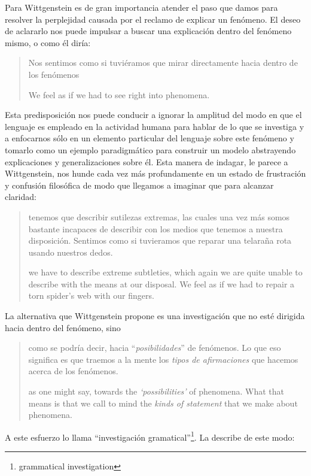 Para Wittgenstein es de gran importancia atender el paso que damos para resolver
la perplejidad causada por el reclamo de explicar un fenómeno. El deseo de
aclararlo nos puede impulsar a buscar una explicación dentro del fenómeno mismo,
o como él diría:
\blockquote[We feel as if we had to see right into phenomena.
{\cite[\S90]{wittgenstein1953phiinv}}]{Nos sentimos como si tuviéramos que mirar
  directamente hacia dentro de los fenómenos}.
Esta predisposición nos puede conducir a ignorar la amplitud del modo en que el
lenguaje es empleado en la actividad humana para hablar de lo que se investiga y
a enfocarnos sólo en un elemento particular del lenguaje sobre este fenómeno y
tomarlo como un ejemplo paradigmático para construir un modelo abstrayendo
explicaciones y generalizaciones sobre él. Esta manera de indagar, le parece a
Wittgenstein, nos hunde cada vez más profundamente en un estado de frustración y
confusión filosófica de modo que llegamos a imaginar que para alcanzar claridad:
\blockquote[we have to describe extreme subtleties, which again we are quite
unable to describe with the means at our disposal. We feel as if we had to
repair a torn spider's web with our fingers.
{\cite[\S106]{wittgenstein1953phiinv}}]{tenemos que describir sutilezas
  extremas, las cuales una vez más somos bastante incapaces de describir con los
  medios que tenemos a nuestra disposición. Sentimos como si tuvieramos que
  reparar una telaraña rota usando nuestros dedos.}

La alternativa que Wittgenstein propone es una investigación que no esté
dirigida hacia dentro del fenómeno, sino
\blockquote[as one might say, towards the \emph{`possibilities'} of phenomena.
What that means is that we call to mind the \emph{kinds of statement} that we
make about phenomena. {\cite[\S90]{wittgenstein1953phiinv}}]{como se podría
  decir, hacia \enquote{\emph{posibilidades}} de fenómenos. Lo que eso significa
  es que traemos a la mente los \emph{tipos de afirmaciones} que hacemos acerca
  de los fenómenos.}

A este esfuerzo lo llama \enquote{investigación gramatical}\footnote{grammatical
  investigation}. La describe de este modo:

